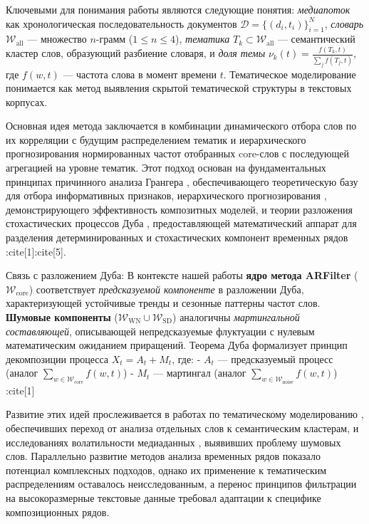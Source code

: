 \documentclass[14pt,a4paper]{article}
\begin{document}
Ключевыми для понимания работы являются следующие понятия: \textit{медиапоток} как хронологическая последовательность документов \(\mathcal{D} = \{(d_i,t_i)\}_{i=1}^{N}\), \textit{словарь} \(\mathcal{W}_{\mathrm{all}}\) — множество \(n\)-грамм (\(1 \leq n \leq 4\)), \textit{тематика} \(T_k \subset \mathcal{W}_{\mathrm{all}}\) — семантический кластер слов, образующий разбиение словаря, и \textit{доля темы} \(\nu_k(t) = \frac{f(T_k,t)}{\sum_j f(T_j,t)}\), где \(f(w,t)\) — частота слова в момент времени \(t\). Тематическое моделирование понимается как метод выявления скрытой тематической структуры в текстовых корпусах.

Основная идея метода заключается в комбинации динамического отбора слов по их корреляции с будущим распределением тематик и иерархического прогнозирования нормированных частот отобранных core-слов с последующей агрегацией на уровне тематик. Этот подход основан на фундаментальных принципах причинного анализа Грангера \cite{Granger1969}, обеспечивающего теоретическую базу для отбора информативных признаков, иерархического прогнозирования \cite{Hyndman2011}, демонстрирующего эффективность композитных моделей, и теории разложения стохастических процессов Дуба \cite{Doob1953}, предоставляющей математический аппарат для разделения детерминированных и стохастических компонент временных рядов :cite[1]:cite[5]. 

Связь с разложением Дуба: 
В контексте нашей работы \textbf{ядро метода ARFilter} (\(\mathcal{W}_{\text{core}}\)) соответствует \textit{предсказуемой компоненте} в разложении Дуба, характеризующей устойчивые тренды и сезонные паттерны частот слов. \textbf{Шумовые компоненты} (\(\mathcal{W}_{\text{WN}} \cup \mathcal{W}_{\text{SD}}\)) аналогичны \textit{мартингальной составляющей}, описывающей непредсказуемые флуктуации с нулевым математическим ожиданием приращений. Теорема Дуба формализует принцип декомпозиции процесса \(X_t = A_t + M_t\), где:
- \(A_t\) — предсказуемый процесс (аналог \(\sum_{w \in \mathcal{W}_{\text{core}}} f(w,t)\))
- \(M_t\) — мартингал (аналог \(\sum_{w \in \mathcal{W}_{\text{noise}}} f(w,t)\)) :cite[1]


Развитие этих идей прослеживается в работах по тематическому моделированию \cite{blei2003latent, sinaga2020unsupervised}, обеспечивших переход от анализа отдельных слов к семантическим кластерам, и исследованиях волатильности медиаданных \cite{rappaz2019dynamic}, выявивших проблему шумовых слов. Параллельно развитие методов анализа временных рядов \cite{Shumway2000, Bouchaud2018} показало потенциал комплексных подходов, однако их применение к тематическим распределениям оставалось неисследованным, а перенос принципов фильтрации \cite{Gardner1985} на высокоразмерные текстовые данные требовал адаптации к специфике композиционных рядов.
\end{document}
